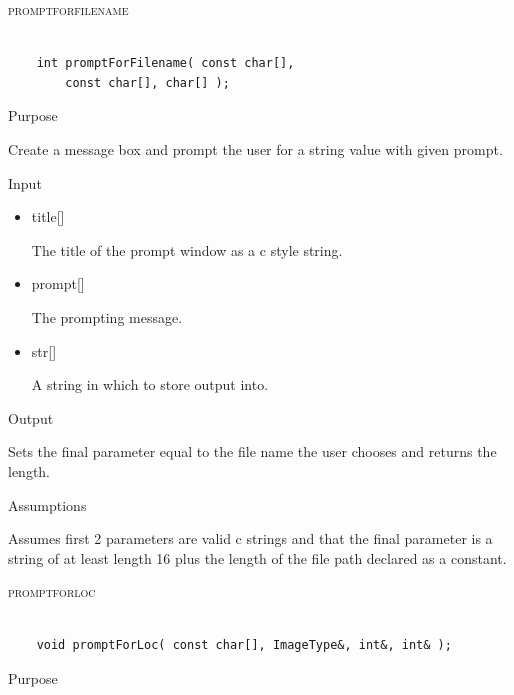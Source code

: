 \documentclass[pdftex, 11pt]{article}
\begin{document}
\begin{description}
	\item{\textsc{promptforfilename}}

		\begin{lstlisting}

	int promptForFilename( const char[], 
		const char[], char[] );
		\end{lstlisting}

		\begin{description}
			\item{Purpose}

				Create a message box and prompt the user for a string value with given prompt.

			\item{Input}

				\begin{itemize}

					\item{title[]}

						The title of the prompt window as a c style string.

					\item{prompt[]}

						The prompting message.

					\item{str[]}

						A string in which to store output into.

				\end{itemize}

			\item{Output}

				Sets the final parameter equal to the file name the user
				chooses and returns the length.

			\item{Assumptions}

				Assumes first 2 parameters are valid c strings and that
				the final parameter is a string of at least length 16 plus
				the length of the file path declared as a constant.

		\end{description}



	\item{\textsc{promptforloc}}

		\begin{lstlisting}

	void promptForLoc( const char[], ImageType&, int&, int& );
		\end{lstlisting}

		\begin{description}
			\item{Purpose}


\end{description}
\end{description}
\end{document}
